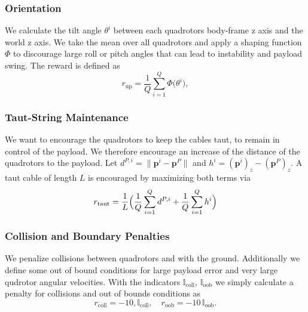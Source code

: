 \subsubsection{Orientation}
We calculate the tilt angle \(\theta^i\) between each quadrotors body-frame z axis and the world z axis. We take the mean over all quadrotors and apply a shaping function \(\Phi\) to discourage large roll or pitch angles that can lead to instability and payload swing. The reward is defined as
\begin{equation}
r_{\mathrm{up}}
= \frac{1}{Q}\sum_{i=1}^Q \Phi\bigl(\theta^i\bigr),
\end{equation}

\subsubsection{Taut-String Maintenance}
We want to encourage the quadrotors to keep the cables taut, to remain in control of the payload. We therefore encourage an increase of the distance of the quadrotors to the payload. Let \(d^{P,i}=\lVert\mathbf{p}^i-\mathbf{p}^P\rVert\) and \(h^i=(\mathbf{p}^i)_z-(\mathbf{p}^P)_z\). A taut cable of length \(L\) is encouraged by maximizing both terms via
\begin{equation}
r_{\mathrm{taut}}
= \frac{1}{L}\Bigl(\frac{1}{Q}\sum_{i=1}^Q d^{P,i} + \frac{1}{Q}\sum_{i=1}^Q h^i\Bigr)
\end{equation}


\subsubsection{Collision and Boundary Penalties}
We penalize collisions between quadrotors and with the ground. Additionally we define some out of bound conditions for large payload error and very large qudrotor angular velocities.
With the indicators \(\mathbb{I}_{\mathrm{coll}}\), \(\mathbb{I}_{\mathrm{oob}}\) we simply calculate a penalty for collisions and out of bounds conditions as
\begin{equation}
r_{\mathrm{coll}} = -10,\mathbb{I}_{\mathrm{coll}}, 
\quad
r_{\mathrm{oob}} = -10\,\mathbb{I}_{\mathrm{oob}}.
\end{equation}

